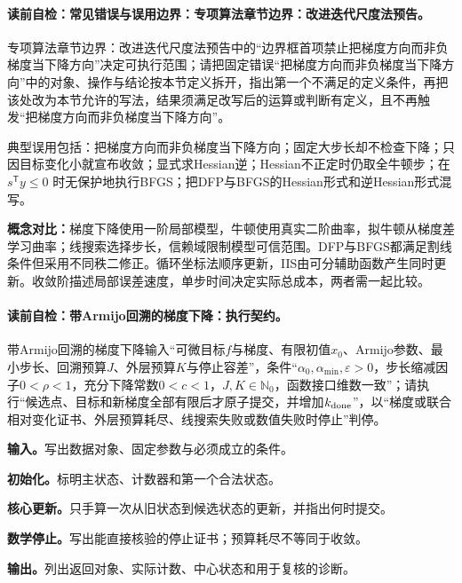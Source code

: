 \label{struct:V1-C08-CH32}
\paragraph{读前自检：常见错误与误用边界：专项算法章节边界：改进迭代尺度法预告。}专项算法章节边界：改进迭代尺度法预告中的“边界框首项禁止把梯度方向而非负梯度当下降方向”决定可执行范围；请把固定错误“把梯度方向而非负梯度当下降方向”中的对象、操作与结论按本节定义拆开，指出第一个不满足的定义条件，再把该处改为本节允许的写法，结果须满足改写后的运算或判断有定义，且不再触发“把梯度方向而非负梯度当下降方向”。\par

\begin{warningbox}
典型误用包括：把梯度方向而非负梯度当下降方向；固定大步长却不检查下降；只因目标变化小就宣布收敛；显式求Hessian逆；Hessian不正定时仍取全牛顿步；在 $s^{\mathsf T}y\le0$ 时无保护地执行BFGS；把DFP与BFGS的Hessian形式和逆Hessian形式混写。
\end{warningbox}

\label{struct:V1-C08-CH33}
\begin{comparisonbox}
\textbf{概念对比：}梯度下降使用一阶局部模型，牛顿使用真实二阶曲率，拟牛顿从梯度差学习曲率；线搜索选择步长，信赖域限制模型可信范围。DFP与BFGS都满足割线条件但采用不同秩二修正。循环坐标法顺序更新，IIS由可分辅助函数产生同时更新。收敛阶描述局部误差速度，单步时间决定实际总成本，两者需一起比较。
\end{comparisonbox}

\paragraph{读前自检：带Armijo回溯的梯度下降：执行契约。}带Armijo回溯的梯度下降输入“可微目标$f$与梯度、有限初值$x_0$、Armijo参数、最小步长、回溯预算$J$、外层预算$K$与停止容差”，条件“$\alpha_0,\alpha_{\min},\varepsilon>0$，步长缩减因子$0<\rho<1$，充分下降常数$0<c<1$，$J,K\in\mathbb N_0$，函数接口维数一致”；请执行“候选点、目标和新梯度全部有限后才原子提交，并增加$k_{\rm done}$”，以“梯度或联合相对变化证书、外层预算耗尽、线搜索失败或数值失败时停止”判停。\par
\begin{keypointbox}[title={带Armijo回溯的梯度下降：五步阅读}]
\textbf{输入。}写出数据对象、固定参数与必须成立的条件。\par
\textbf{初始化。}标明主状态、计数器和第一个合法状态。\par
\textbf{核心更新。}只手算一次从旧状态到候选状态的更新，并指出何时提交。\par
\textbf{数学停止。}写出能直接核验的停止证书；预算耗尽不等同于收敛。\par
\textbf{输出。}列出返回对象、实际计数、中心状态和用于复核的诊断。
\end{keypointbox}

